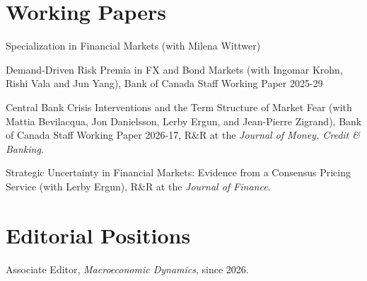 \documentclass[margin,line, 11pt]{res}
\newenvironment{list1}{
  \begin{list}{\ding{113}}{%
      \setlength{\itemsep}{0in}
      \setlength{\parsep}{0in} \setlength{\parskip}{0in}
      \setlength{\topsep}{0in} \setlength{\partopsep}{0in} 
      \setlength{\leftmargin}{0.17in}}}{\end{list}}
\begin{document}
\begin{resume}
\section{\sc Working Papers}
\begin{list1}
\item[] Specialization in Financial Markets (with Milena Wittwer)
\vspace*{0.2cm}
\item[] Demand-Driven Risk Premia in FX and Bond Markets (with Ingomar Krohn, Rishi Vala and Jun Yang), Bank of Canada Staff Working Paper 2025-29
\vspace*{0.2cm}
\item[] Central Bank Crisis Interventions and the Term Structure of Market Fear (with Mattia Bevilacqua, Jon Danielsson, Lerby Ergun,  and Jean-Pierre Zigrand), Bank of Canada Staff Working Paper 2026-17, R\&R at the \textit{Journal of Money, Credit \& Banking}.
\vspace*{0.2cm}
\item[] Strategic Uncertainty in Financial Markets: Evidence from a Consensus Pricing Service (with Lerby Ergun), R\&R at the \textit{Journal of Finance}.
\end{list1}

\section{\sc Editorial Positions}
\begin{list1}
\item[] Associate Editor, \textit{Macroeconomic Dynamics}, since 2026.
\end{list1}



\end{resume}
\end{document}
